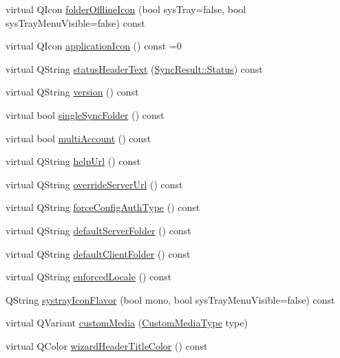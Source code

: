 \begin{DoxyCompactItemize}
\item 
virtual Q\+Icon \hyperlink{class_o_c_c_1_1_theme_aff29313f1322b0d0039142dd3dee604d}{folder\+Offline\+Icon} (bool sys\+Tray=false, bool sys\+Tray\+Menu\+Visible=false) const
\item 
virtual Q\+Icon \hyperlink{class_o_c_c_1_1_theme_a379b81bad736957d69add51e2355be38}{application\+Icon} () const =0
\item 
virtual Q\+String \hyperlink{class_o_c_c_1_1_theme_a9ef83c4bc35f22dd1106a2d382c84d75}{status\+Header\+Text} (\hyperlink{class_o_c_c_1_1_sync_result_a4f4487ea8c462f2ec90c43bce6df1d1e}{Sync\+Result\+::\+Status}) const
\item 
virtual Q\+String \hyperlink{class_o_c_c_1_1_theme_a9b457f4102f98cc7709d5eaf77dcb47c}{version} () const
\item 
virtual bool \hyperlink{class_o_c_c_1_1_theme_a2ba5502ededd143f64ec4a09b856675e}{single\+Sync\+Folder} () const
\item 
virtual bool \hyperlink{class_o_c_c_1_1_theme_a1d9b3da46c44c4367c65053a5d143eab}{multi\+Account} () const
\item 
virtual Q\+String \hyperlink{class_o_c_c_1_1_theme_aba73a024ee17d93542b7a129d4cea822}{help\+Url} () const
\item 
virtual Q\+String \hyperlink{class_o_c_c_1_1_theme_a7e24755065ba1e7ade6eae55b767915f}{override\+Server\+Url} () const
\item 
virtual Q\+String \hyperlink{class_o_c_c_1_1_theme_a51ae685be44e04fdc490e1986f2973ea}{force\+Config\+Auth\+Type} () const
\item 
virtual Q\+String \hyperlink{class_o_c_c_1_1_theme_a4db1b04919bcdf3d209b7666aebd7b2c}{default\+Server\+Folder} () const
\item 
virtual Q\+String \hyperlink{class_o_c_c_1_1_theme_a8a45db118cc3ae16796857490d907f53}{default\+Client\+Folder} () const
\item 
virtual Q\+String \hyperlink{class_o_c_c_1_1_theme_a87734666c55e9796b0f4335983b0ade5}{enforced\+Locale} () const
\item 
Q\+String \hyperlink{class_o_c_c_1_1_theme_afdda3a238298ac997f66d22887b7da68}{systray\+Icon\+Flavor} (bool mono, bool sys\+Tray\+Menu\+Visible=false) const
\item 
virtual Q\+Variant \hyperlink{class_o_c_c_1_1_theme_ac248812f511fad2b02d376b451bba2ec}{custom\+Media} (\hyperlink{class_o_c_c_1_1_theme_a7d36668d1fd0d715e4e1d8f4590d2d5d}{Custom\+Media\+Type} type)
\item 
virtual Q\+Color \hyperlink{class_o_c_c_1_1_theme_ac819e011427048af3c7e50ad34f6f77f}{wizard\+Header\+Title\+Color} () const

\end{DoxyCompactItemize}
